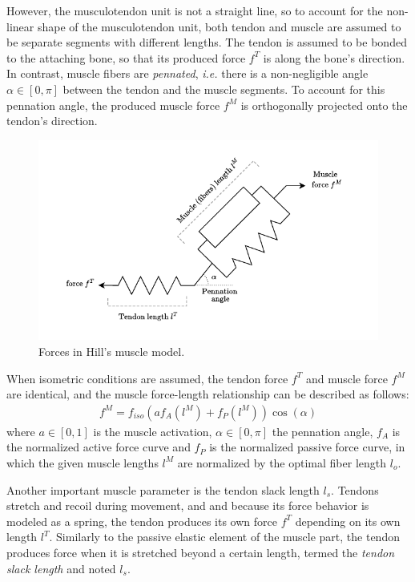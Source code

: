 However, the musculotendon unit is not a straight line, so to account for the non-linear shape of the musculotendon unit, both tendon and muscle are assumed to be separate segments with different lengths. The tendon is assumed to be bonded to the attaching bone, so that its produced force $f^T$ is along the bone's direction. In contrast, muscle fibers are \emph{pennated}, \emph{i.e.} there is a non-negligible angle $\alpha \in [0, \pi]$ between the tendon and the muscle segments. To account for this pennation angle, the produced muscle force $f^M$ is orthogonally projected onto the tendon's direction. 
\begin{figure}[!htb]
    \captionsetup{justification=centering}
    \centering
    \includegraphics[trim={20 15 30 15}, clip, width=0.6\linewidth]{img/chapter_1/hill_mechanical_force_model.drawio.pdf}
    \caption{Forces in Hill's muscle model.}
    \label{fig:hill_mech_model_forces}
\end{figure}

When isometric conditions are assumed, the tendon force $f^T$ and muscle force $f^M$ are identical, and the muscle force-length relationship can be described as follows:
\begin{align*}
    f^M = f_{iso}(af_A(l^M) + f_P(l^M))\cos (\alpha)
\end{align*}
where $a\in [0,1]$ is the muscle activation, $\alpha\in [0, \pi]$ the pennation angle, $f_A$ is the normalized active force curve and $f_P$ is the normalized passive force curve, in which the given muscle lengths $l^M$ are normalized by the optimal fiber length $l_o$.

Another important muscle parameter is the tendon slack length $l_s$.
Tendons stretch and recoil during movement, and and because its force behavior is modeled as a spring, the tendon produces its own force $f^T$ depending on its own length $l^T$. Similarly to the passive elastic element of the muscle part, the tendon produces force when it is stretched beyond a certain length, termed the \emph{tendon slack length} and noted $l_s$.

